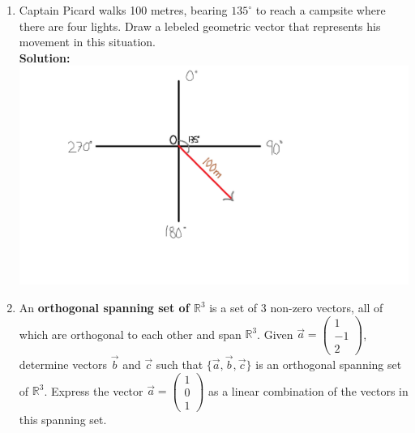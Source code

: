 \documentclass[12pt]{book}
\begin{document}
\begin{enumerate}
\begin{enumerate}
\end{enumerate}



\newpage

\item Captain Picard walks 100 metres, bearing $135^{\circ}$ to reach a campsite where there are four lights. Draw a lebeled geometric vector that represents his movement in this situation.\\

\textbf{Solution:}\\
\includegraphics[scale=1]{Q2Image.png}

\newpage

\setcounter{equation}{0}
\item An \textbf{orthogonal spanning set of $\mathbb{R}^3$} is a set of 3 non-zero vectors, all of which are orthogonal to each other and span $\mathbb{R}^3$. Given $\vec{a} = \left(\begin{smallmatrix} 1 \\ -1 \\ 2 \end{smallmatrix}\right)$, determine vectors $\vec{b}$ and $\vec{c}$ such that $\{\vec{a}, \vec{b}, \vec{c}\}$ is an orthogonal spanning set of $\mathbb{R}^3$. Express the vector $\vec{a}= \left(\begin{smallmatrix} 1 \\ 0 \\ 1 \end{smallmatrix}\right)$ as a linear combination of the vectors in this spanning set. \\


\end{enumerate}
\end{document}
